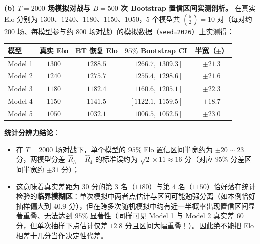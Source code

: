 \textbf{(b) $T = 2000$ 场模拟对战与 $B = 500$ 次 Bootstrap 置信区间实测剖析。}
在真实 Elo 分别为 $1300$、$1240$、$1180$、$1150$、$1050$，$5$ 个模型共 $\binom{5}{2} = 10$ 对（每对约 $200$ 场、每模型参与约 $800$ 场对战）的模拟数据（\texttt{seed=2026}）上实测得：
\begin{center}
\footnotesize
\begin{tabular}{lcccc}
\toprule
模型 & 真实 Elo & BT 恢复 Elo & $95\%$ Bootstrap CI & 半宽（$\pm$） \\
\midrule
Model 1 & $1300$ & $1288.5$ & $[1266.7,\; 1309.3]$ & $\pm 21.3$ \\
Model 2 & $1240$ & $1275.7$ & $[1255.4,\; 1298.6]$ & $\pm 21.6$ \\
Model 3 & $1180$ & $1182.4$ & $[1160.6,\; 1205.1]$ & $\pm 22.3$ \\
Model 4 & $1150$ & $1141.5$ & $[1122.1,\; 1159.5]$ & $\pm 18.7$ \\
Model 5 & $1050$ & $1032.1$ & $[1006.5,\; 1052.5]$ & $\pm 23.0$ \\
\bottomrule
\end{tabular}
\end{center}
\textbf{统计分辨力结论}：
\begin{itemize}
  \item 在 $T = 2000$ 场对战下，单个模型的 $95\%$ Elo 置信区间半宽约为 $\pm 20 \sim 23$ 分，两模型分差 $\hat{R}_3 - \hat{R}_4$ 的标准误约为 $\sqrt{2}\times 11 \approx 16$ 分（对应 $95\%$ 分差区间半宽约 $\pm 31$ 分）；
  \item 这意味着真实差距为 $30$ 分的第 3 名（$1180$）与第 4 名（$1150$）恰好落在统计检验的\textbf{临界模糊区}：单次模拟中两者点估计与区间可能勉强分离（如本例恰好抽样偏大到 $40.9$ 分），但在跨多次随机模拟中约有近一半概率出现置信区间显著重叠、无法达到 $95\%$ 显著性（同样可见 Model 1 与 Model 2 真实差 $60$ 分，但单次抽样下点估计仅差 $12.8$ 分且区间大幅重叠！）。因此绝不能把 Elo 相差十几分当作决定性代差。
\end{itemize}


